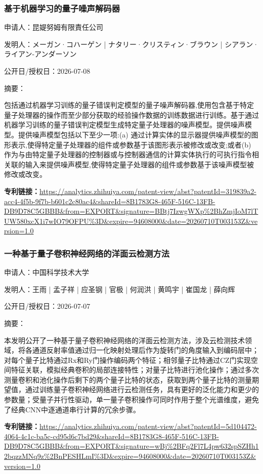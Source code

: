 \documentclass[12pt,a4paper]{ctexart}
\begin{document}
\subsubsection{ 基于机器学习的量子噪声解码器 }

申请人：昆媞努姆有限責任公司

发明人：メーガン·コハーゲン | ナタリー·クリスティン·ブラウン | シアラン·ライアン-アンダーソン

公开日/授权日：2026-07-08

摘要：

包括通过机器学习训练的量子错误判定模型的量子噪声解码器,使用包含基于特定量子处理器的操作而至少部分获取的经验操作数据的训练数据进行训练。基于通过机器学习训练的量子错误判定模型生成特定量子处理器的噪声模型。提供噪声模型。提供噪声模型包括以下至少一项:(a) 通过计算实体的显示器提供噪声模型的图形表示,使得特定量子处理器的组件或参数基于该图形表示被修改或改变;或者(b) 作为与由特定量子处理器的控制器或与控制器通信的计算实体执行的可执行指令相关联的输入来提供噪声模型,使得特定量子处理器的组件或参数基于该噪声模型被修改或改变。

\noindent\textbf{专利链接：}\url{https://analytics.zhihuiya.com/patent-view/abst?patentId=319839a2-acc4-4f5b-9f7b-b601c2c80ac4&shareId=8B1783G8-465F-516C-13FB-DB9D78C5GBBB&from=EXPORT&signature=BBtj7IzwgWXp%2BhZmjIoM7lTUW580xcX1i7wIO79OFPU%3D&expire=94608000&date=20260710T003153Z&version=1.0}

\subsubsection{ 一种基于量子卷积神经网络的洋面云检测方法 }

申请人：中国科学技术大学

发明人：王雨 | 孟子祥 | 应圣钢 | 官极 | 何润洪 | 黄鸣宇 | 崔国龙 | 薛向辉

公开日/授权日：2026-07-07

摘要：

本发明公开了一种基于量子卷积神经网络的洋面云检测方法，涉及云检测技术领域，将各通道反射率值通过归一化映射处理后作为旋转门的角度输入到编码层中；对每个量子比特通过Rx和Ry门操作编码两个特征；相邻量子比特通过CZ门实现空间特征关联，模拟经典卷积的局部连接特性；对量子比特进行池化操作；通过多次测量卷积和池化操作后剩下的两个量子比特的状态，获取到两个量子比特的测量期望值，通过训练量子卷积神经网络进行云检测任务，具有更好的泛化能力和更少的参数量；受量子并行性驱动，单一量子卷积操作可同时作用于整个光谱维度，避免了经典CNN中逐通道串行计算的冗余步骤。

\noindent\textbf{专利链接：}\url{https://analytics.zhihuiya.com/patent-view/abst?patentId=5d104472-4064-4c1c-ba5c-cd95d6c7bd29&shareId=8B1783G8-465F-516C-13FB-DB9D78C5GBBB&from=EXPORT&signature=wBj%2BFq2Fl7L4pw632spSZHh12bqzzMNq9z%2BnPESHLmI%3D&expire=94608000&date=20260710T003153Z&version=1.0}
\end{document}
